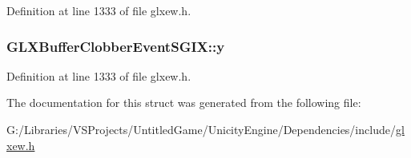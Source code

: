 Definition at line 1333 of file glxew.\+h.

\hypertarget{struct_g_l_x_buffer_clobber_event_s_g_i_x_aef21efa11558a5b67861f96471c56003}{}
\subsubsection[{y}]{ G\+L\+X\+Buffer\+Clobber\+Event\+S\+G\+I\+X\+::y}\label{struct_g_l_x_buffer_clobber_event_s_g_i_x_aef21efa11558a5b67861f96471c56003}


Definition at line 1333 of file glxew.\+h.



The documentation for this struct was generated from the following file\+:\begin{DoxyCompactItemize}
\item 
G\+:/\+Libraries/\+V\+S\+Projects/\+Untitled\+Game/\+Unicity\+Engine/\+Dependencies/include/\hyperlink{glxew_8h}{glxew.\+h}\end{DoxyCompactItemize}
